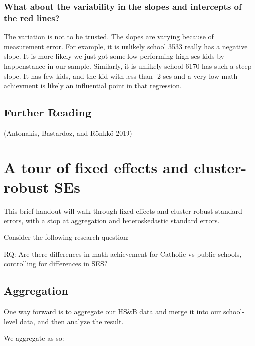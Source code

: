 \documentclass[
  letterpaper,
  DIV=11,
  numbers=noendperiod]{scrreprt}
\begin{document}
\hypertarget{what-about-the-variability-in-the-slopes-and-intercepts-of-the-red-lines}{%
\subsection{What about the variability in the slopes and intercepts of
the red
lines?}\label{what-about-the-variability-in-the-slopes-and-intercepts-of-the-red-lines}}

The variation is not to be trusted. The slopes are varying because of
measurement error. For example, it is unlikely school 3533 really has a
negative slope. It is more likely we just got some low performing high
ses kids by happenstance in our sample. Similarly, it is unlikely school
6170 has such a steep slope. It has few kids, and the kid with less than
-2 ses and a very low math achievment is likely an influential point in
that regression.

\hypertarget{further-reading-3}{%
\section{Further Reading}\label{further-reading-3}}

(Antonakis, Bastardoz, and Rönkkö 2019)

\hypertarget{a-tour-of-fixed-effects-and-cluster-robust-ses}{%
\chapter{A tour of fixed effects and cluster-robust
SEs}\label{a-tour-of-fixed-effects-and-cluster-robust-ses}}

This brief handout will walk through fixed effects and cluster robust
standard errors, with a stop at aggregation and heteroskedastic standard
errors.

Consider the following research question:

RQ: Are there differences in math achievement for Catholic vs public
schools, controlling for differences in SES?

\hypertarget{aggregation}{%
\section{Aggregation}\label{aggregation}}

One way forward is to aggregate our HS\&B data and merge it into our
school-level data, and then analyze the result.

We aggregate as so:
\end{document}
